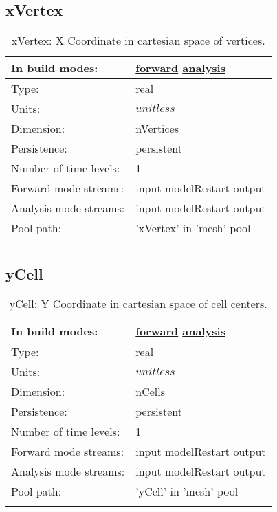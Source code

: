\subsection[xVertex]{xVertex}
\label{subsec:var_sec_mesh_xVertex}
\begin{center}
\begin{longtable}{| p{2.0in} | p{4.0in} |}
        \hline 
        In build modes: & \hyperref[subsec:forward_var_tab_mesh]{forward} \hyperref[subsec:analysis_var_tab_mesh]{analysis} \\
        \hline 
        Type: & real \\
        \hline 
        Units: & $unitless$ \\
        \hline 
        Dimension: & nVertices \\
        \hline 
        Persistence: & persistent \\
        \hline 
        Number of time levels: & 1 \\
        \hline 
		 Forward mode streams: &  input modelRestart output \\
        \hline 
		 Analysis mode streams: &  input modelRestart output \\
        \hline 
            Pool path: & 'xVertex' in 'mesh' pool
 \\
		 \hline 
    \caption{xVertex: X Coordinate in cartesian space of vertices.}
\end{longtable}
\end{center}
\subsection[yCell]{yCell}
\label{subsec:var_sec_mesh_yCell}
\begin{center}
\begin{longtable}{| p{2.0in} | p{4.0in} |}
        \hline 
        In build modes: & \hyperref[subsec:forward_var_tab_mesh]{forward} \hyperref[subsec:analysis_var_tab_mesh]{analysis} \\
        \hline 
        Type: & real \\
        \hline 
        Units: & $unitless$ \\
        \hline 
        Dimension: & nCells \\
        \hline 
        Persistence: & persistent \\
        \hline 
        Number of time levels: & 1 \\
        \hline 
		 Forward mode streams: &  input modelRestart output \\
        \hline 
		 Analysis mode streams: &  input modelRestart output \\
        \hline 
            Pool path: & 'yCell' in 'mesh' pool
 \\
		 \hline 
    \caption{yCell: Y Coordinate in cartesian space of cell centers.}
\end{longtable}
\end{center}
